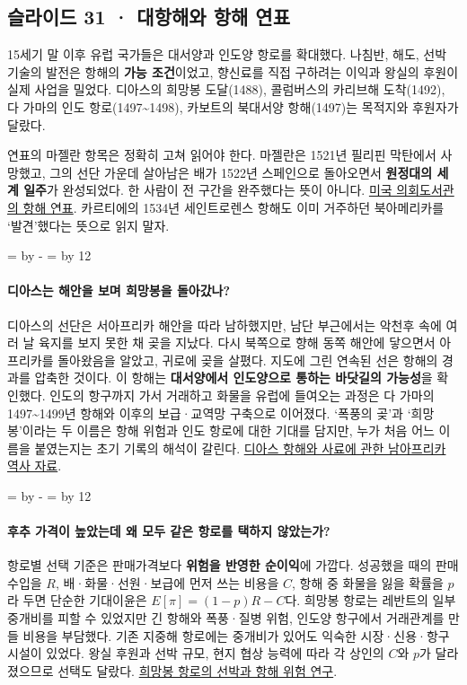 \documentclass[10pt,a4paper]{article}
\newcommand{\ReserveQuestionSpace}{%
  \par\begingroup
  \dimen0=\pagegoal \advance\dimen0 by -\pagetotal
  \dimen2=\baselineskip \multiply\dimen2 by 12
  \ifdim\dimen0<\dimen2 \newpage\fi
  \endgroup}
\begin{document}
\subsection{슬라이드 31 · 대항해와 항해 연표}
15세기 말 이후 유럽 국가들은 대서양과 인도양 항로를 확대했다. 나침반, 해도, 선박 기술의 발전은 항해의 \textbf{가능 조건}이었고, 향신료를 직접 구하려는 이익과 왕실의 후원이 실제 사업을 밀었다. 디아스의 희망봉 도달(1488), 콜럼버스의 카리브해 도착(1492), 다 가마의 인도 항로(1497\textasciitilde{}1498), 카보트의 북대서양 항해(1497)는 목적지와 후원자가 달랐다.\par

연표의 마젤란 항목은 정확히 고쳐 읽어야 한다. 마젤란은 1521년 필리핀 막탄에서 사망했고, 그의 선단 가운데 살아남은 배가 1522년 스페인으로 돌아오면서 \textbf{원정대의 세계 일주}가 완성되었다. 한 사람이 전 구간을 완주했다는 뜻이 아니다. \href{https://www.loc.gov/item/today-in-history/november-28/}{미국 의회도서관의 항해 연표}. 카르티에의 1534년 세인트로렌스 항해도 이미 거주하던 북아메리카를 ‘발견’했다는 뜻으로 읽지 말자.\par

\ReserveQuestionSpace
\paragraph{디아스는 해안을 보며 희망봉을 돌아갔나?}
디아스의 선단은 서아프리카 해안을 따라 남하했지만, 남단 부근에서는 악천후 속에 여러 날 육지를 보지 못한 채 곶을 지났다. 다시 북쪽으로 향해 동쪽 해안에 닿으면서 아프리카를 돌아왔음을 알았고, 귀로에 곶을 살폈다. 지도에 그린 연속된 선은 항해의 경과를 압축한 것이다. 이 항해는 \textbf{대서양에서 인도양으로 통하는 바닷길의 가능성}을 확인했다. 인도의 항구까지 가서 거래하고 화물을 유럽에 들여오는 과정은 다 가마의 1497\textasciitilde{}1499년 항해와 이후의 보급·교역망 구축으로 이어졌다. ‘폭풍의 곶’과 ‘희망봉’이라는 두 이름은 항해 위험과 인도 항로에 대한 기대를 담지만, 누가 처음 어느 이름을 붙였는지는 초기 기록의 해석이 갈린다. \href{https://sahistory.org.za/people/bartolomeu-dias}{디아스 항해와 사료에 관한 남아프리카 역사 자료}.\par

\ReserveQuestionSpace
\paragraph{후추 가격이 높았는데 왜 모두 같은 항로를 택하지 않았는가?}
항로별 선택 기준은 판매가격보다 \textbf{위험을 반영한 순이익}에 가깝다. 성공했을 때의 판매수입을 $R$, 배·화물·선원·보급에 먼저 쓰는 비용을 $C$, 항해 중 화물을 잃을 확률을 $p$라 두면 단순한 기대이윤은 $E[\pi]=(1-p)R-C$다. 희망봉 항로는 레반트의 일부 중개비를 피할 수 있었지만 긴 항해와 폭풍·질병 위험, 인도양 항구에서 거래관계를 만들 비용을 부담했다. 기존 지중해 항로에는 중개비가 있어도 익숙한 시장·신용·항구 시설이 있었다. 왕실 후원과 선박 규모, 현지 협상 능력에 따라 각 상인의 $C$와 $p$가 달라졌으므로 선택도 달랐다. \href{https://www.cambridge.org/core/journals/social-science-history/article/turning-points-in-leadership-ship-size-in-the-portuguese-and-dutch-merchant-empires/05AA8EAB13D75D6DE5BCBDD02B8739A2}{희망봉 항로의 선박과 항해 위험 연구}.\par
\end{document}
